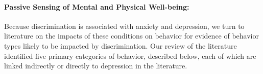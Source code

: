 
\paragraph{Passive Sensing of Mental and Physical Well-being:}
\label{sec:back-mhealth}

Because discrimination is associated with anxiety and depression, we turn to literature on the impacts of these conditions on behavior for evidence of behavior types likely to be impacted by discrimination. 
Our review of the literature identified five primary categories of behavior, described below, each of which are linked indirectly or directly to depression in the literature. %


